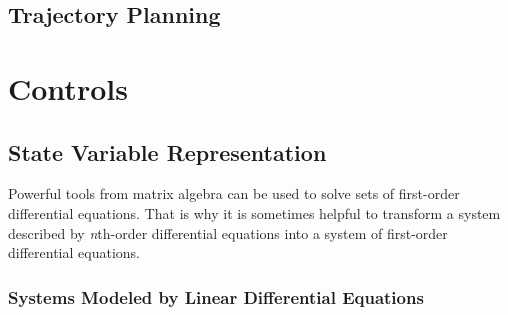 \documentclass[11pt]{book}
\theoremstyle{example}
\begin{document}
\section{Trajectory Planning}

\chapter{Controls}

\section{State Variable Representation}

Powerful tools from matrix algebra can be used to solve sets of first-order differential equations. That is why it is sometimes helpful to transform a system described by \emph{n}th-order differential equations into a system of first-order differential equations.

\subsection{Systems Modeled by Linear Differential Equations}
\end{document}
